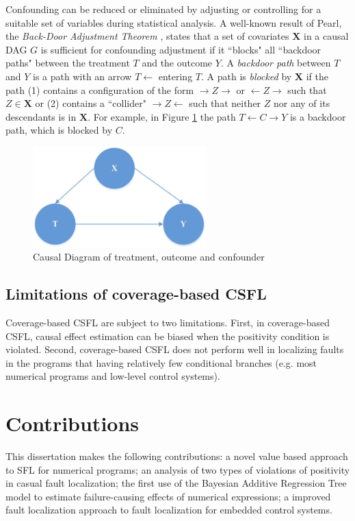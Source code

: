 Confounding can be reduced or eliminated by adjusting or controlling for a suitable set of variables during statistical analysis.  A well-known result of Pearl, the {\it Back-Door Adjustment Theorem} \cite{pearl2000models}, states that a set of covariates $\mathbf{X}$ in a causal DAG $G$ is sufficient for confounding adjustment if it ``blocks" all ``backdoor paths" between the treatment $T$ and the outcome $Y$.  A {\it backdoor path} between $T$ and $Y$ is a path with an arrow $T \leftarrow$ entering $T$.  A path is {\it blocked} by $\pmb{X}$ if the path (1) contains a configuration of the form $\rightarrow Z \rightarrow$ or $\leftarrow Z \rightarrow$ such that  $Z \in \mathbf{X}$ or (2) contains a ``collider" $\rightarrow Z \leftarrow$  such that neither $Z$ nor any of its descendants is in $\mathbf{X}$.  For example, in Figure \ref{fig2.2} the path $T \leftarrow C \rightarrow Y$ is a backdoor path, which is blocked by $C$.

\begin{figure}[htb!]
\vspace{0em}
\begin{center}
\includegraphics[width=0.6\textwidth]{chapter2_CausalDAG1.pdf}
\vspace {0em}\caption{Causal Diagram of treatment, outcome and confounder} \label{fig2.2}
\end{center}
\vspace {0em}
\end{figure}

\subsection{Limitations of coverage-based CSFL}
Coverage-based CSFL are subject to two limitations. First, in coverage-based CSFL, causal effect estimation can be biased when the positivity condition is violated.  Second,  coverage-based CSFL does not perform well in localizing faults in the programs that having relatively few conditional branches (e.g. most numerical programs and low-level control systems). 

\section {Contributions}
This dissertation makes the following contributions: a novel value based approach to SFL for numerical programs; an analysis of two types of violations of positivity in casual fault localization; the first use of the Bayesian Additive Regression Tree model to estimate failure-causing effects of numerical expressions;  a improved fault localization approach to fault localization for embedded control systems.

